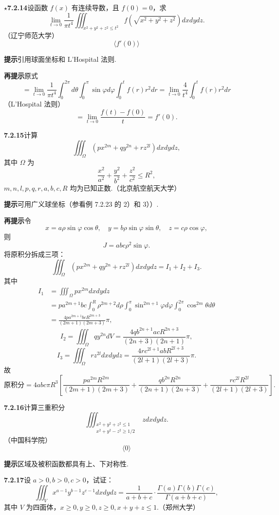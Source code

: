 \documentclass[UTF8, 12pt, fontset=fandol, oneside]{ctexart}
\begin{document}
\noindent\textbf{$\star$7.2.14}\quad 设函数 $f(x)$ 有连续导数，且 $f(0)=0$，求
\[
\lim_{t\to0}\frac1{\pi t^4}
\iiint_{x^2+y^2+z^2\le t^2}
f\left(\sqrt{x^2+y^2+z^2}\right)dxdydz.
\]
（辽宁师范大学）
\[
\langle f'(0)\rangle
\]

\noindent\textbf{提示}\quad 引用球面坐标和 L'Hospital 法则.

\noindent\textbf{再提示}\quad 原式
\[
=\lim_{t\to0}\frac1{\pi t^4}\int_0^{2\pi}d\theta
\int_0^\pi\sin\varphi d\varphi\int_0^tf(r)r^2dr
=\lim_{t\to0}\frac4{t^4}\int_0^tf(r)r^2dr
\]
（L'Hospital 法则）
\[
=\lim_{t\to0}\frac{f(t)-f(0)}t=f'(0).
\]

\noindent\textbf{7.2.15}\quad 计算
\[
\iiint_\Omega(px^{2m}+qy^{2n}+rz^{2l})dxdydz,
\]
其中 $\Omega$ 为
\[
\frac{x^2}{a^2}+\frac{y^2}{b^2}+\frac{z^2}{c^2}\le R^2,
\]
$m,n,l,p,q,r,a,b,c,R$ 均为已知正数.（北京航空航天大学）

\noindent\textbf{提示}\quad 可用广义球坐标（参看例 7.2.23 的 2）和 3））.

\noindent\textbf{再提示}\quad 令
\[
x=a\rho\sin\varphi\cos\theta,\quad
y=b\rho\sin\varphi\sin\theta,\quad
z=c\rho\cos\varphi, \tag{1}
\]
则
\[
J=abc\rho^2\sin\varphi. \tag{2}
\]
将原积分拆成三项：
\[
\iiint_\Omega(px^{2m}+qy^{2n}+rz^{2l})dxdydz=I_1+I_2+I_3.
\]
其中
\[
\begin{aligned}
I_1&=\iiint_\Omega px^{2m}dxdydz\\
&=pa^{2m+1}bc\int_0^R\rho^{2m+2}d\rho
\int_0^\pi\sin^{2m+1}\varphi d\varphi
\int_0^{2\pi}\cos^{2m}\theta d\theta\\
&=\frac{4pa^{2m+1}bcR^{2m+3}}{(2m+1)(2m+3)}\pi,
\end{aligned}
\]
\[
I_2=\iiint_\Omega qy^{2n}dV
=\frac{4qb^{2n+1}acR^{2n+3}}{(2n+3)(2n+1)}\pi,
\]
\[
I_3=\iiint_\Omega rz^{2l}dxdydz
=\frac{4rc^{2l+1}abR^{2l+3}}{(2l+1)(2l+3)}\pi.
\]
故
\[
\text{原积分}=4abc\pi R^3
\left[
\frac{pa^{2m}R^{2m}}{(2m+1)(2m+3)}
+\frac{qb^{2n}R^{2n}}{(2n+1)(2n+3)}
+\frac{rc^{2l}R^{2l}}{(2l+1)(2l+3)}
\right].
\]

\noindent\textbf{7.2.16}\quad 计算三重积分
\[
\iiint_{\substack{x^2+y^2+z^2\le1\\x^2+y^2-z^2\ge1/2}}zdxdydz.
\]
（中国科学院）
\[
\langle0\rangle
\]

\noindent\textbf{提示}\quad 区域及被积函数都具有上、下对称性.

\noindent\textbf{7.2.17}\quad 设 $a>0,b>0,c>0$，试证：
\[
\iiint_V x^{a-1}y^{b-1}z^{c-1}dxdydz
=\frac1{a+b+c}\cdot\frac{\Gamma(a)\Gamma(b)\Gamma(c)}{\Gamma(a+b+c)},
\]
其中 $V$ 为四面体，$x\ge0,y\ge0,z\ge0,x+y+z\le1$.（郑州大学）
\end{document}
